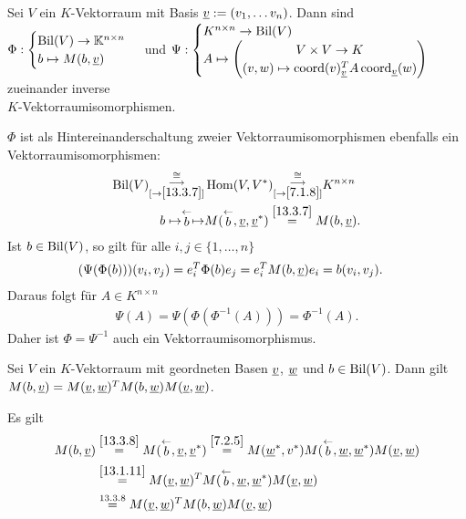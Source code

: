 \documentclass[../../main.tex]{subfiles}
\begin{document}
\begin{sat}\label{13.3.9}
Sei $V$ ein $K$-Vektorraum mit Basis ${\underline v}:=(v_1,\ldots v_n)$. Dann sind\\ $\Phi:\begin{cases}\operatorname{Bil}(V)\to \mathbb K^{n\times n}\\ b\mapsto M(b,{\underline v})\end{cases}$ und $\Psi: \begin{cases}K^{n\times n}\to \Bil(V)\\A\mapsto\begin{pmatrix*}V\times V\to K\\ (v,w)\mapsto \co(v)_{\v}^TA\co_\v(w)\end{pmatrix*}\end{cases}$ zueinander inverse\\ $K$-Vektorraumisomorphismen.
\end{sat}
\begin{cproof} $\Phi$ ist als Hintereinanderschaltung zweier Vektorraumisomorphismen ebenfalls ein Vektorraumisomorphismen:
\begin{align*}
\operatorname{Bil}(V)\substack{\cong\\\longrightarrow\\ [\to\ref{13.3.7}]}&\operatorname{Hom}(V,V^*)\substack{\cong\\\longrightarrow\\ [\to\ref{7.1.8}]}K^{n\times n}\\
b\mapsto\stackrel{\leftarrow}{b}\mapsto &M(\stackrel{\leftarrow}{b},{\underline v},{\underline v}^*)\stackrel{\ref{13.3.7}}{=}M(b,{\underline v}).
\end{align*}
Ist $b\in \operatorname{Bil}(V)$, so gilt für alle $i,j\in\{1,\ldots ,n\}$
\begin{align*}
	(\Psi(\Phi(b)))(v_i,v_j)&=e_i^T\Phi(b)e_j=e_i^TM(b,{\underline v})e_i=b(v_i,v_j).
\end{align*}
Daraus folgt für $A\in K^{n\times n}$
\begin{align*}
	\Psi(A)=\Psi(\Phi(\Phi^{-1}(A)))=\Phi^{-1}(A).
\end{align*}
Daher ist $\Phi=\Psi^{-1}$ auch ein Vektorraumisomorphismus.
\end{cproof}

\begin{sat}\label{13.3.10}
Sei $V$ ein $K$-Vektorraum mit geordneten Basen ${\underline v}$, ${\underline w}$ und $b\in \operatorname{Bil}(V)$. Dann gilt $M(b,{\underline v})=M({\underline v},{\underline w})^TM(b,{\underline w})M({\underline v},{\underline w})$.
\end{sat}
\begin{cproof} Es gilt
\begin{align*}
M(b,{\underline v})&\stackrel{\ref{13.3.8}}{=}M(\stackrel{\leftarrow}{b}, {\underline v},{\underline v}^*)\stackrel{\ref{7.2.5}}{=}M({\underline w}^*,v^*)M(\stackrel{\leftarrow}{b},{\underline w},{\underline w}^*)M({\underline v},{\underline w})\\
&\stackrel{\ref{13.1.11}}{=}M({\underline v},{\underline w})^TM(\stackrel{\leftarrow}{b},{\underline w},{\underline w}^*)M({\underline v},{\underline w})\\
&\stackrel{13.3.8}{=}M({\underline v},{\underline w})^TM(b,{\underline w})M({\underline v},{\underline w})
\end{align*}
\end{cproof}
\end{document}
